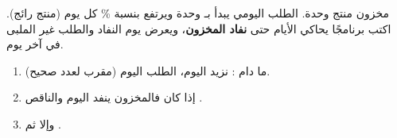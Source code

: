 \begin{statement}
مخزون منتج  وحدة. الطلب اليومي يبدأ بـ  وحدة ويرتفع بنسبة \% كل يوم (منتج رائج). اكتب برنامجًا يحاكي الأيام حتى \textbf{نفاد المخزون}، ويعرض يوم النفاد والطلب غير الملبى في آخر يوم.
\end{statement}
\begin{stepsbox}\begin{enumerate}
\item ما دام : نزيد اليوم، الطلب اليوم  (مقرب لعدد صحيح).
\item إذا كان  فالمخزون ينفد اليوم والناقص .
\item وإلا  ثم .
\end{enumerate}\end{stepsbox}
